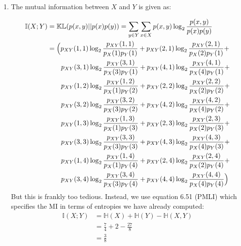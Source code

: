 \documentclass[11pt,twoside]{article}
\newcommand{\pts}[1]{\marginpar{ \small\hspace{0pt} \textit{[#1]} } }
\newcommand{\?}{\stackrel{?}{=}}
\newcommand{\fr}{\frac}
\newcommand{\bl}{\color{blue}}
\newenvironment{solution}{\begin{adjustwidth}{.05\textwidth}{}\bl}{\medskip\end{adjustwidth}}
\begin{document}
\begin{enumerate}[\bf (a)]
\item The mutual information between \pts{1} $X$ and $Y$ is given as:
  \begin{solution}
    \begin{align*}
      \mathbb{I}(X;Y) &= \mathbb{KL}(p(x,y)||p(x)p(y)) = \sum_{y\in Y}\sum_{x\in X} p(x, y) \log_2\fr{p(x,y)}{p(x)p(y)}\\
                      &=  \Bigl( 
                        p_{XY}(1,1)\log_2\fr{p_{XY}(1,1)}{p_X(1)p_Y(1)} +
                        p_{XY}(2,1)\log_2\fr{p_{XY}(2,1)}{p_X(2)p_Y(1)} + \\ &\qquad
                        p_{XY}(3,1)\log_2\fr{p_{XY}(3,1)}{p_X(3)p_Y(1)} +
                        p_{XY}(4,1)\log_2\fr{p_{XY}(4,1)}{p_X(4)p_Y(1)} + \\ &\qquad
                        p_{XY}(1,2)\log_2\fr{p_{XY}(1,2)}{p_X(1)p_Y(2)} +
                        p_{XY}(2,2)\log_2\fr{p_{XY}(2,2)}{p_X(2)p_Y(2)} + \\ &\qquad
                        p_{XY}(3,2)\log_2\fr{p_{XY}(3,2)}{p_X(3)p_Y(2)} +
                        p_{XY}(4,2)\log_2\fr{p_{XY}(4,2)}{p_X(4)p_Y(2)} + \\ &\qquad
                        p_{XY}(1,3)\log_2\fr{p_{XY}(1,3)}{p_X(1)p_Y(3)} +
                        p_{XY}(2,3)\log_2\fr{p_{XY}(2,3)}{p_X(2)p_Y(3)} + \\ &\qquad
                        p_{XY}(3,3)\log_2\fr{p_{XY}(3,3)}{p_X(3)p_Y(3)} +
                        p_{XY}(4,3)\log_2\fr{p_{XY}(4,3)}{p_X(4)p_Y(3)} + \\ &\qquad
                        p_{XY}(1,4)\log_2\fr{p_{XY}(1,4)}{p_X(1)p_Y(4)} +
                        p_{XY}(2,4)\log_2\fr{p_{XY}(2,4)}{p_X(2)p_Y(4)} + \\ &\qquad
                        p_{XY}(3,4)\log_2\fr{p_{XY}(3,4)}{p_X(3)p_Y(4)} +
                        p_{XY}(4,4)\log_2\fr{p_{XY}(4,4)}{p_X(4)p_Y(4)} \Bigr)         
    \end{align*}
    But this is frankly too tedious. Instead, we use equation 6.51 (PMLI) which specifies the MI in terms of entropies we have already computed:
    \begin{align*}
      \mathbb{I}(X;Y) &=  \mathbb{H}(X) + \mathbb{H}(Y) - \mathbb{H}(X,Y) \\
                      &= \fr74 + 2 - \fr{27}{8} \\
                      &=  \fr38
    \end{align*}
  \end{solution}
\end{enumerate}
\end{document}
